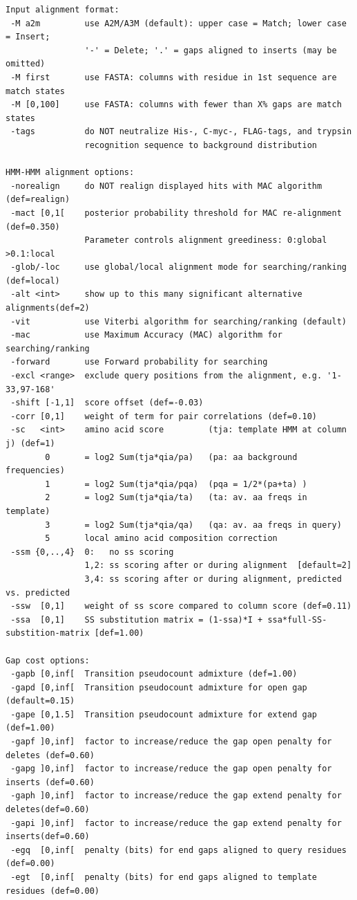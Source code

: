 \documentclass[11pt,a4paper]{article}
\begin{document}
\begin{verbatim}
Input alignment format:                                                       
 -M a2m         use A2M/A3M (default): upper case = Match; lower case = Insert;
                '-' = Delete; '.' = gaps aligned to inserts (may be omitted)   
 -M first       use FASTA: columns with residue in 1st sequence are match states
 -M [0,100]     use FASTA: columns with fewer than X% gaps are match states   
 -tags          do NOT neutralize His-, C-myc-, FLAG-tags, and trypsin 
                recognition sequence to background distribution    

HMM-HMM alignment options:                                                    
 -norealign     do NOT realign displayed hits with MAC algorithm (def=realign)   
 -mact [0,1[    posterior probability threshold for MAC re-alignment (def=0.350)
                Parameter controls alignment greediness: 0:global >0.1:local
 -glob/-loc     use global/local alignment mode for searching/ranking (def=local)
 -alt <int>     show up to this many significant alternative alignments(def=2)
 -vit           use Viterbi algorithm for searching/ranking (default)       
 -mac           use Maximum Accuracy (MAC) algorithm for searching/ranking
 -forward       use Forward probability for searching                       
 -excl <range>  exclude query positions from the alignment, e.g. '1-33,97-168' 
 -shift [-1,1]  score offset (def=-0.03)                                       
 -corr [0,1]    weight of term for pair correlations (def=0.10)                
 -sc   <int>    amino acid score         (tja: template HMM at column j) (def=1)
        0       = log2 Sum(tja*qia/pa)   (pa: aa background frequencies)    
        1       = log2 Sum(tja*qia/pqa)  (pqa = 1/2*(pa+ta) )               
        2       = log2 Sum(tja*qia/ta)   (ta: av. aa freqs in template)     
        3       = log2 Sum(tja*qia/qa)   (qa: av. aa freqs in query)        
        5       local amino acid composition correction                     
 -ssm {0,..,4}  0:   no ss scoring                                             
                1,2: ss scoring after or during alignment  [default=2]       
                3,4: ss scoring after or during alignment, predicted vs. predicted 
 -ssw  [0,1]    weight of ss score compared to column score (def=0.11)     
 -ssa  [0,1]    SS substitution matrix = (1-ssa)*I + ssa*full-SS-substition-matrix [def=1.00)

Gap cost options:                                                                      
 -gapb [0,inf[  Transition pseudocount admixture (def=1.00)                           
 -gapd [0,inf[  Transition pseudocount admixture for open gap (default=0.15)          
 -gape [0,1.5]  Transition pseudocount admixture for extend gap (def=1.00)            
 -gapf ]0,inf]  factor to increase/reduce the gap open penalty for deletes (def=0.60) 
 -gapg ]0,inf]  factor to increase/reduce the gap open penalty for inserts (def=0.60) 
 -gaph ]0,inf]  factor to increase/reduce the gap extend penalty for deletes(def=0.60)
 -gapi ]0,inf]  factor to increase/reduce the gap extend penalty for inserts(def=0.60)
 -egq  [0,inf[  penalty (bits) for end gaps aligned to query residues (def=0.00)      
 -egt  [0,inf[  penalty (bits) for end gaps aligned to template residues (def=0.00)   


\end{verbatim}
\end{document}
